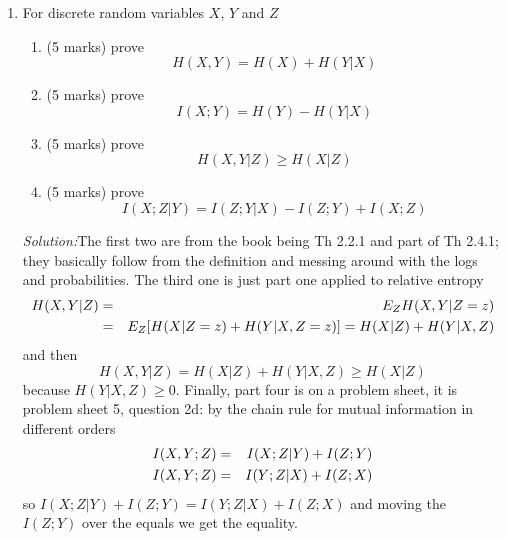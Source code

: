 \documentclass[12pt]{article}
\newcommand{\soln}{\noindent\textit{Solution:}}
\begin{document}
\begin{enumerate}
\item %
For discrete random variables $X$, $Y$ and $Z$
\begin{enumerate} 
\item (5 marks) prove
$$H(X,Y)=H(X)+H(Y|X)$$
\item (5 marks) prove
$$I(X;Y)=H(Y)-H(Y|X)$$
\item (5 marks) prove
$$H(X,Y|Z)\ge H(X|Z)$$
\item (5 marks) prove
$$I(X;Z|Y)=I(Z;Y|X)-I(Z;Y)+I(X;Z)$$ 
\end{enumerate}

\soln The first two are from the book being Th 2.2.1 and part of Th 2.4.1; they basically follow from the definition and messing around with the logs and probabilities. The third one is just part one applied to relative entropy
\begin{eqnarray}
H(X,Y|Z)&=&E_ZH(X,Y|Z=z)\cr
&=&E_Z[H(X|Z=z)+H(Y|X,Z=z)]=H(X|Z)+H(Y|X,Z)
\end{eqnarray}
and then
\begin{equation}
H(X,Y|Z)=H(X|Z)+H(Y|X,Z)\ge H(X|Z)
\end{equation}
because $H(Y|X,Z)\ge 0$. Finally, part four is on a problem sheet, it is problem sheet 5, question 2d:  by the chain rule for mutual information in different orders
\begin{eqnarray}
I(X,Y;Z)&=&I(X;Z|Y)+I(Z;Y)\cr
I(X,Y;Z)&=&I(Y;Z|X)+I(Z;X)
\end{eqnarray}
so $I(X;Z|Y)+I(Z;Y)=I(Y;Z|X)+I(Z;X)$ and moving the $I(Z;Y)$ over the equals we get the equality.

\end{enumerate}
 
\end{document}
